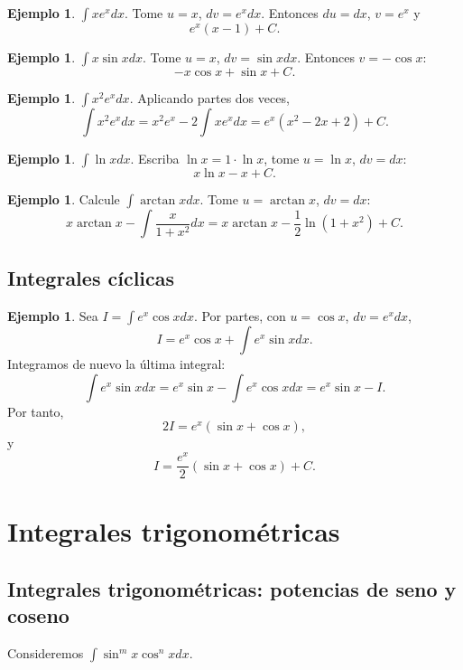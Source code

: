 \documentclass[12pt]{article}
\theoremstyle{definition}
\newtheorem{ejemplo}[teorema]{Ejemplo}
\theoremstyle{remark}
\begin{document}
\begin{ejemplo}$\int xe^xdx$. Tome $u=x$, $dv=e^xdx$. Entonces $du=dx$, $v=e^x$ y
\[\boxed{e^x(x-1)+C}.\]\end{ejemplo}

\begin{ejemplo}$\int x\sin xdx$. Tome $u=x$, $dv=\sin xdx$. Entonces $v=-\cos x$:
\[\boxed{-x\cos x+\sin x+C}.\]\end{ejemplo}

\begin{ejemplo}$\int x^2e^xdx$. Aplicando partes dos veces,
\[\int x^2e^xdx=x^2e^x-2\int xe^xdx=\boxed{e^x(x^2-2x+2)+C}.\]\end{ejemplo}

\begin{ejemplo}$\int\ln xdx$. Escriba $\ln x=1\cdot\ln x$, tome $u=\ln x$, $dv=dx$:
\[\boxed{x\ln x-x+C}.\]\end{ejemplo}

\begin{ejemplo}Calcule $\int\arctan xdx$. Tome $u=\arctan x$, $dv=dx$:
\[x\arctan x-\int\frac{x}{1+x^2}dx=\boxed{x\arctan x-\frac12\ln(1+x^2)+C}.\]\end{ejemplo}
\subsection*{Integrales cíclicas}
\begin{ejemplo}Sea $I=\int e^x\cos xdx$. Por partes, con $u=\cos x$, $dv=e^xdx$,
\[I=e^x\cos x+\int e^x\sin xdx.\]
Integramos de nuevo la última integral:
\[\int e^x\sin xdx=e^x\sin x-\int e^x\cos xdx=e^x\sin x-I.\]
Por tanto,
\[2I=e^x(\sin x+\cos x),\]
y
\[\boxed{I=\frac{e^x}{2}(\sin x+\cos x)+C}.\]\end{ejemplo}

\section{Integrales trigonométricas}
\subsection*{Integrales trigonométricas: potencias de seno y coseno}
Consideremos $\int\sin^m x\cos^n xdx$.
\end{document}
